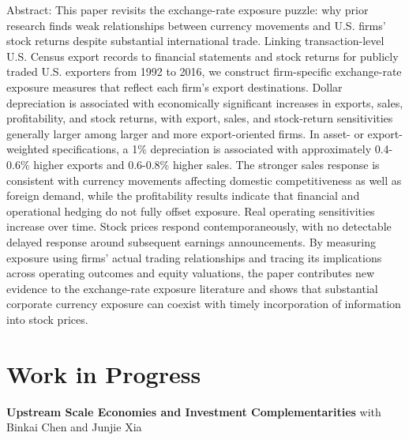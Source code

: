 \documentclass[11pt,letterpaper]{article}
\begin{document}
Abstract: This paper revisits the exchange-rate exposure puzzle: why prior research finds weak relationships between currency movements and U.S. firms' stock returns despite substantial international trade. Linking transaction-level U.S. Census export records to financial statements and stock returns for publicly traded U.S. exporters from 1992 to 2016, we construct firm-specific exchange-rate exposure measures that reflect each firm's export destinations. Dollar depreciation is associated with economically significant increases in exports, sales, profitability, and stock returns, with export, sales, and stock-return sensitivities generally larger among larger and more export-oriented firms. In asset- or export-weighted specifications, a 1\% depreciation is associated with approximately 0.4-0.6\% higher exports and 0.6-0.8\% higher sales. The stronger sales response is consistent with currency movements affecting domestic competitiveness as well as foreign demand, while the profitability results indicate that financial and operational hedging do not fully offset exposure. Real operating sensitivities increase over time. Stock prices respond contemporaneously, with no detectable delayed response around subsequent earnings announcements. By measuring exposure using firms' actual trading relationships and tracing its implications across operating outcomes and equity valuations, the paper contributes new evidence to the exchange-rate exposure literature and shows that substantial corporate currency exposure can coexist with timely incorporation of information into stock prices.
\par\addvspace{9pt}
\section*{Work in Progress}
\textbf{Upstream Scale Economies and Investment Complementarities} with Binkai Chen and Junjie Xia\par\nopagebreak\vspace{2pt}\nopagebreak
\end{document}
